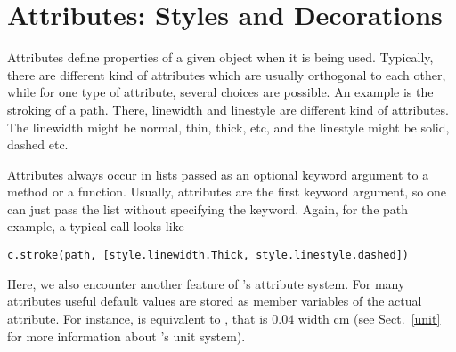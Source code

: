 \section{Attributes: Styles and Decorations}

\label{graphics:attributes}

Attributes define properties of a given object when it is being used.
Typically, there are different kind of attributes which are usually
orthogonal to each other, while for one type of attribute, several
choices are possible. An example is the stroking of a path. There,
linewidth and linestyle are different kind of attributes. The linewidth
might be normal, thin, thick, etc, and the linestyle might be solid,
dashed etc.

Attributes always occur in lists passed as an optional keyword argument
to a method or a function. Usually, attributes are the first keyword
argument, so one can just pass the list without specifying the keyword.
Again, for the path example, a typical call looks like

\begin{verbatim}
c.stroke(path, [style.linewidth.Thick, style.linestyle.dashed])
\end{verbatim}

Here, we also encounter another feature of \PyX's attribute system. For
many attributes useful default values are stored as member variables of
the actual attribute. For instance,  is
equivalent to , that is
$0.04$ width cm (see Sect.~\ref{unit} for more information about
\PyX's unit system). 

